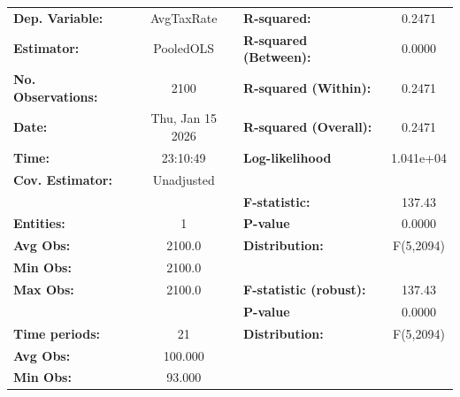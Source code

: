 \begin{center}
\begin{tabular}{lclc}
\toprule
\textbf{Dep. Variable:}                           &     AvgTaxRate     & \textbf{  R-squared:         }   &      0.2471      \\
\textbf{Estimator:}                               &     PooledOLS      & \textbf{  R-squared (Between):}  &      0.0000      \\
\textbf{No. Observations:}                        &        2100        & \textbf{  R-squared (Within):}   &      0.2471      \\
\textbf{Date:}                                    &  Thu, Jan 15 2026  & \textbf{  R-squared (Overall):}  &      0.2471      \\
\textbf{Time:}                                    &      23:10:49      & \textbf{  Log-likelihood     }   &    1.041e+04     \\
\textbf{Cov. Estimator:}                          &     Unadjusted     & \textbf{                     }   &                  \\
\textbf{}                                         &                    & \textbf{  F-statistic:       }   &      137.43      \\
\textbf{Entities:}                                &         1          & \textbf{  P-value            }   &      0.0000      \\
\textbf{Avg Obs:}                                 &       2100.0       & \textbf{  Distribution:      }   &    F(5,2094)     \\
\textbf{Min Obs:}                                 &       2100.0       & \textbf{                     }   &                  \\
\textbf{Max Obs:}                                 &       2100.0       & \textbf{  F-statistic (robust):} &      137.43      \\
\textbf{}                                         &                    & \textbf{  P-value            }   &      0.0000      \\
\textbf{Time periods:}                            &         21         & \textbf{  Distribution:      }   &    F(5,2094)     \\
\textbf{Avg Obs:}                                 &      100.000       & \textbf{                     }   &                  \\
\textbf{Min Obs:}                                 &       93.000       & \textbf{                     }   &                  \\

\end{tabular}
\end{center}
